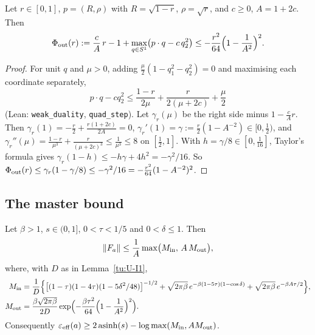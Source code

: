 \begin{lemma}\label{tu:U-outer}
Let $r\in[0,1]$, $p=(R,\rho)$ with $R=\sqrt{1-r}$, $\rho=\sqrt r$, and $c\ge0$, $A=1+2c$. Then
\[
\Phi_{\rm out}(r):=\frac cA\,r-1+\max_{q\in S^1}\bigl(p\cdot q-c\,q_2^2\bigr)\le-\frac{r^2}{64}\Bigl(1-\frac1{A^2}\Bigr)^2 .
\]
\end{lemma}

\begin{proof}
For unit $q$ and $\mu>0$, adding $\frac\mu2(1-q_1^2-q_2^2)=0$ and maximising each coordinate separately,
\[
p\cdot q-cq_2^2\le\frac{1-r}{2\mu}+\frac{r}{2(\mu+2c)}+\frac\mu2
\]
(Lean: \texttt{weak\_duality}, \texttt{quad\_step}). Let $\gamma_r(\mu)$ be the right side minus $1-\frac cAr$. Then
$\gamma_r(1)=-\frac r2+\frac{r(1+2c)}{2A}=0$, $\gamma_r'(1)=\gamma:=\frac r2(1-A^{-2})\in[0,\frac12)$, and
$\gamma_r''(\mu)=\frac{1-r}{\mu^3}+\frac{r}{(\mu+2c)^3}\le\frac1{\mu^3}\le8$ on $[\frac12,1]$. With $h=\gamma/8\in[0,\frac1{16}]$,
Taylor's formula gives $\gamma_r(1-h)\le-h\gamma+4h^2=-\gamma^2/16$. So
$\Phi_{\rm out}(r)\le\gamma_r(1-\gamma/8)\le-\gamma^2/16=-\frac{r^2}{64}(1-A^{-2})^2$.
\end{proof}

\subsection{The master bound}

\begin{theorem}\label{tu:U-F-master}
Let $\beta>1$, $s\in(0,1]$, $0<\tau<1/5$ and $0<\delta\le1$. Then
\[
\|F_a\|\le\frac1A\max\bigl(M_{\rm in},\,A\,M_{\rm out}\bigr),
\]
where, with $D$ as in Lemma~\ref{tu:U-I1},
\begin{align*}
M_{\rm in}&=\frac1D\Bigl\{\bigl[(1-\tau)(1-4\tau)(1-5\delta^2/48)\bigr]^{-1/2}+\sqrt{2\pi\beta}\,e^{-\beta(1-5\tau)(1-\cos\delta)}+\sqrt{2\pi\beta}\,e^{-\beta A\tau/2}\Bigr\},\\
M_{\rm out}&=\frac{\beta\sqrt{2\pi\beta}}{2D}\exp\Bigl(-\frac{\beta\tau^2}{64}\Bigl(1-\frac1{A^2}\Bigr)^2\Bigr).
\end{align*}
Consequently $\varepsilon_{\mathrm{eff}}(a)\ge2\operatorname{asinh}(s)-\log\max(M_{\rm in},AM_{\rm out})$.
\end{theorem}

